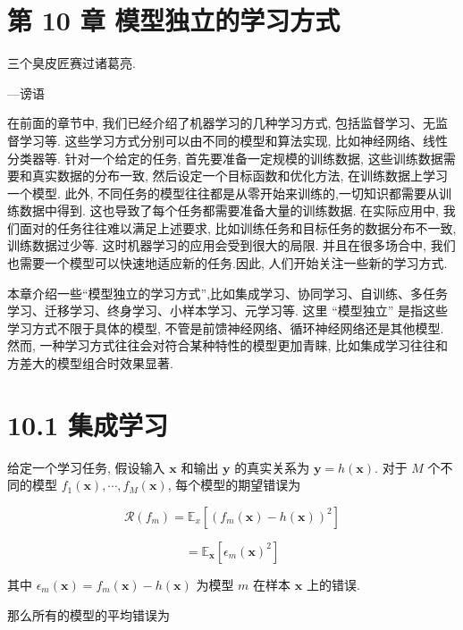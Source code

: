 \documentclass[10pt]{article}
\begin{document}
\section*{第 10 章 模型独立的学习方式}
三个臭皮匠赛过诸葛亮.

—谤语

在前面的章节中, 我们已经介绍了机器学习的几种学习方式, 包括监督学习、无监督学习等. 这些学习方式分别可以由不同的模型和算法实现, 比如神经网络、线性分类器等. 针对一个给定的任务, 首先要准备一定规模的训练数据, 这些训练数据需要和真实数据的分布一致, 然后设定一个目标函数和优化方法, 在训练数据上学习一个模型. 此外, 不同任务的模型往往都是从零开始来训练的,一切知识都需要从训练数据中得到. 这也导致了每个任务都需要准备大量的训练数据. 在实际应用中, 我们面对的任务往往难以满足上述要求, 比如训练任务和目标任务的数据分布不一致, 训练数据过少等. 这时机器学习的应用会受到很大的局限. 并且在很多场合中, 我们也需要一个模型可以快速地适应新的任务.因此, 人们开始关注一些新的学习方式.

本章介绍一些“模型独立的学习方式”,比如集成学习、协同学习、自训练、多任务学习、迁移学习、终身学习、小样本学习、元学习等. 这里 “模型独立” 是指这些学习方式不限于具体的模型, 不管是前馈神经网络、循环神经网络还是其他模型. 然而, 一种学习方式往往会对符合某种特性的模型更加青睐, 比如集成学习往往和方差大的模型组合时效果显著.

\section*{10.1 集成学习}
给定一个学习任务, 假设输入 $\boldsymbol{x}$ 和输出 $\boldsymbol{y}$ 的真实关系为 $\boldsymbol{y}=h(\boldsymbol{x})$. 对于 $M$ 个不同的模型 $f_{1}(\boldsymbol{x}), \cdots, f_{M}(\boldsymbol{x})$, 每个模型的期望错误为


\begin{equation*}
\mathcal{R}\left(f_{m}\right)=\mathbb{E}_{x}\left[\left(f_{m}(\boldsymbol{x})-h(\boldsymbol{x})\right)^{2}\right] \tag{10.1}
\end{equation*}



\begin{equation*}
=\mathbb{E}_{\boldsymbol{x}}\left[\epsilon_{m}(\boldsymbol{x})^{2}\right] \tag{10.2}
\end{equation*}


其中 $\epsilon_{m}(\boldsymbol{x})=f_{m}(\boldsymbol{x})-h(\boldsymbol{x})$ 为模型 $m$ 在样本 $\boldsymbol{x}$ 上的错误.

那么所有的模型的平均错误为
\end{document}

